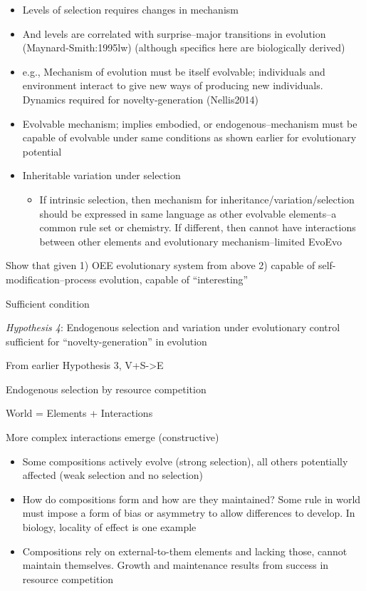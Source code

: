\begin{itemize}
	\item
 Levels of selection requires changes in mechanism
	\item
 And levels are correlated with surprise--major transitions in
 evolution (Maynard-Smith:1995lw) (although specifics here are
 biologically derived)
	\item
 e.g., Mechanism of evolution must be itself evolvable; individuals and
 environment interact to give new ways of producing new individuals.
 Dynamics required for novelty-generation (Nellis2014)
	\item
 Evolvable mechanism; implies embodied, or endogenous--mechanism must
 be capable of evolvable under same conditions as shown earlier for
 evolutionary potential
	\item
 Inheritable variation under selection
 
 \begin{itemize}
	      	\item
 	      If intrinsic selection, then mechanism for
 	      inheritance/variation/selection should be expressed in same language
 	      as other evolvable elements--a common rule set or chemistry. If
 	      different, then cannot have interactions between other elements and
 	      evolutionary mechanism--limited EvoEvo
 \end{itemize}
\end{itemize}

Show that given 1) OEE evolutionary system from above 2) capable of
self-modification--process evolution, capable of ``interesting''

Sufficient condition

\textit{Hypothesis 4}: Endogenous selection and variation under evolutionary control sufficient for ``novelty-generation'' in evolution

From earlier Hypothesis 3, V+S-\textgreater{}E

Endogenous selection by resource competition

World = Elements + Interactions

More complex interactions emerge (constructive)

\begin{itemize}
	\item
 Some compositions actively evolve (strong selection), all others
 potentially affected (weak selection and no selection)
	\item
 How do compositions form and how are they maintained? Some rule in
 world must impose a form of bias or asymmetry to allow differences to
 develop. In biology, locality of effect is one example
	\item
 Compositions rely on external-to-them elements and lacking those,
 cannot maintain themselves. Growth and maintenance results from
 success in resource competition
\end{itemize}


